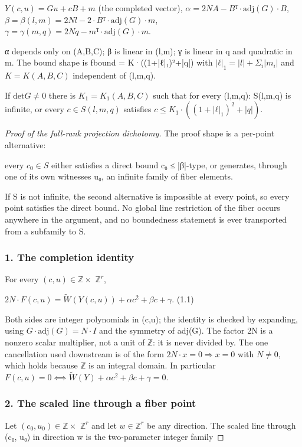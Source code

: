$Y(c,u) = G u + c B + m$        (the completed vector),   $α = 2NA − Bᵀ·\mathrm{adj}(G)·B$,   $β = β(l,m) = 2Nl − 2·Bᵀ·\mathrm{adj}(G)·m$,   $γ = γ(m,q) = 2Nq − mᵀ·\mathrm{adj}(G)·m$.

α depends only on (A,B,C); β is linear in (l,m); γ is linear in q and quadratic in m. The bound shape is fbound = K·((1+|ℓ|₁)²+|q|) with $|ℓ|_{1} = |l| + Σ_{i}|m_{i}|$ and $K = K(A,B,C)$ independent of (l,m,q).

\begin{theorem*}
If $\mathrm{det} G ≠ 0$ there is $K_{1} = K_{1}(A,B,C)$ such that for every (l,m,q): S(l,m,q) is infinite, or every $c ∈ S(l,m,q)$ satisfies $c ≤ K_{1}·((1+|ℓ|_{1})^{2}+|q|)$.

\end{theorem*}
\begin{proof}[Proof of the full-rank projection dichotomy]
The proof shape is a per-point alternative:

every $c_{0} ∈ S$ either satisfies a direct bound c₀ ≤ |β|-type,   or generates, through one of its own witnesses u₀, an infinite   family of fiber elements.

If S is not infinite, the second alternative is impossible at every point, so every point satisfies the direct bound. No global line restriction of the fiber occurs anywhere in the argument, and no boundedness statement is ever transported from a subfamily to S.

\subsubsection*{1. The completion identity}
For every $(c,u) ∈ ℤ ×$ $ℤ^{r}$,

$2N·F(c,u) = \tilde{W}(Y(c,u)) + α c^{2} + β c + γ$.                        (1.1)

Both sides are integer polynomials in (c,u); the identity is checked by expanding, using $G·\mathrm{adj}(G) = N·I$ and the symmetry of adj(G). The factor 2N is a nonzero scalar multiplier, not a unit of ℤ: it is never divided by. The one cancellation used downstream is of the form $2N·x = 0 ⇒ x = 0$ with $N ≠ 0$, which holds because ℤ is an integral domain. In particular $F(c,u) = 0 ⟺ \tilde{W}(Y) + αc^{2} + βc + γ = 0$.

\subsubsection*{2. The scaled line through a fiber point}
Let $(c_{0}, u_{0}) ∈ ℤ ×$ $ℤ^{r}$ and let $w ∈ ℤ^{r}$ be any direction. The scaled line through (c₀, u₀) in direction w is the two-parameter integer family


\end{proof}
